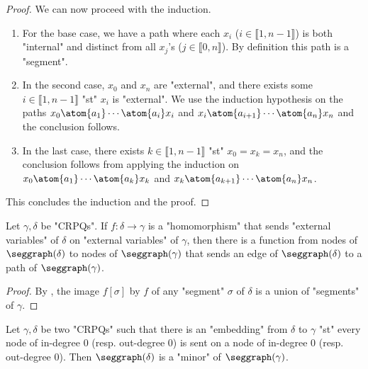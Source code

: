 \begin{proof}
	We can now proceed with the induction.
	\begin{enumerate}
		\item For the base case, we have a path where each $x_i$ ($i \in \lBrack 1,n-1 \rBrack$)
			is both "internal" and distinct from all $x_j$'s ($j\in \lBrack 0,n\rBrack$).
			By definition this path is a "segment".
		\item In the second case, $x_0$ and $x_n$ are "external", and there exists
			some $i \in \lBrack 1,n-1 \rBrack$
			"st" $x_i$ is "external". We use the induction hypothesis on the paths
			$x_0 \atom{a_1} \cdots \atom{a_i} x_i$ and $x_i \atom{a_{i+1}} \cdots \atom{a_n} x_n$
			and the conclusion follows.
		\item In the last case, there exists $k \in \lBrack 1,n-1 \rBrack$
				"st" $x_0 = x_k = x_n$, and the conclusion follows from applying the
				induction on $x_0 \atom{a_1} \cdots \atom{a_k} x_k$ and
				$x_k \atom{a_{k+1}} \cdots \atom{a_n} x_n$.
	\end{enumerate}
	This concludes the induction and the proof.
\end{proof}

\begin{lemma}
	\AP\label{lemma:hom-segments}
	Let $\gamma,\delta$ be "CRPQs".
	If $f\colon \delta \to \gamma$ is a "homomorphism" that sends "external variables"
	of $\delta$ on "external variables" of $\gamma$, then there is a
	function from nodes of $\seggraph(\delta)$ to nodes of $\seggraph(\gamma)$  
	that sends an edge of $\seggraph(\delta)$ to a path of $\seggraph(\gamma)$.
\end{lemma}

\begin{proof}
	By , the image
	$f[\sigma]$ by $f$ of any "segment" $\sigma$ of $\delta$ is a union of
	"segments" of $\gamma$.
\end{proof}

\begin{corollary}
	\AP\label{coro:embedding-segments}
	Let $\gamma, \delta$ be two "CRPQs" such that there is an "embedding" from $\delta$ to $\gamma$
	"st" every node of in-degree 0 (resp. out-degree 0) is sent on a node of in-degree 0
	(resp. out-degree 0). 
	Then $\seggraph(\delta)$ is a "minor" of $\seggraph(\gamma)$.
\end{corollary}

